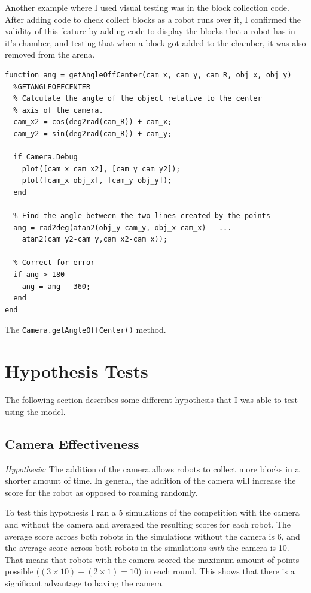 \documentclass[12pt]{article}
\begin{document}
Another example where I used visual testing was in the block collection code. After adding code to check collect blocks as a robot runs over it, I confirmed the validity of this feature by adding code to display the blocks that a robot has in it's chamber, and testing that when a block got added to the chamber, it was also removed from the arena.

\begin{listing}[ht]
\begin{verbatim}
function ang = getAngleOffCenter(cam_x, cam_y, cam_R, obj_x, obj_y)
  %GETANGLEOFFCENTER
  % Calculate the angle of the object relative to the center
  % axis of the camera.
  cam_x2 = cos(deg2rad(cam_R)) + cam_x;
  cam_y2 = sin(deg2rad(cam_R)) + cam_y;
  
  if Camera.Debug
    plot([cam_x cam_x2], [cam_y cam_y2]);
    plot([cam_x obj_x], [cam_y obj_y]);
  end
  
  % Find the angle between the two lines created by the points
  ang = rad2deg(atan2(obj_y-cam_y, obj_x-cam_x) - ...
    atan2(cam_y2-cam_y,cam_x2-cam_x));
  
  % Correct for error
  if ang > 180
    ang = ang - 360;
  end
end
\end{verbatim}
\label{listing:getAngleOffCenter}
\caption{The \texttt{Camera.getAngleOffCenter()} method.}
\end{listing}

\section{Hypothesis Tests}
The following section describes some different hypothesis that I was able to test using the model. 

\subsection{Camera Effectiveness}
\textit{Hypothesis:} The addition of the camera allows robots to collect more blocks in a shorter amount of time. In general, the addition of the camera will increase the score for the robot as opposed to roaming randomly.

To test this hypothesis I ran a 5 simulations of the competition with the camera and without the camera and averaged the resulting scores for each robot. The average score across both robots in the simulations without the camera is 6, and the average score across both robots in the simulations \textit{with} the camera is 10. That means that robots with the camera scored the maximum amount of points possible ($(3 \times 10) - (2 \times 1) = 10$) in each round. This shows that there is a significant advantage to having the camera. 
\end{document}

